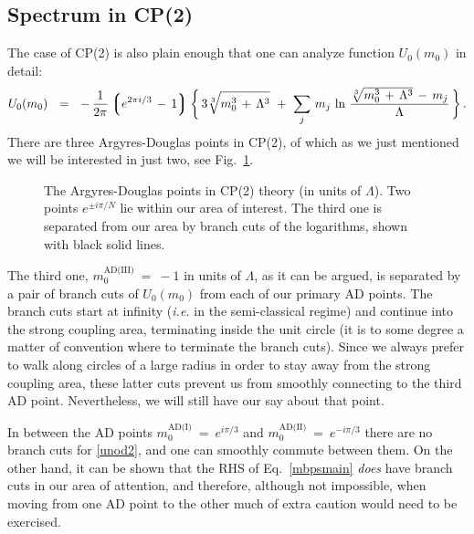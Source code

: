 \documentclass[epsfig,12pt]{article}
\def\beq{\begin{equation}}
\def\eeq{\end{equation}}
\def\beq{\begin{equation}}
\def\eeq{\end{equation}}
\newcommand{\lgr}{\left\lgroup}
\newcommand{\rgr}{\right\rgroup}
\begin{document}
\subsection{Spectrum in CP(2)}


	The case of CP(2) is also plain enough that one can analyze function $ U_0(m_0) $ in detail:
\beq
\label{unod2}
	U_0(m_0) ~~=~~ -\, \frac{1}{2\pi} \lgr e^{2\pi i / 3} \,-\, 1 \rgr 
	\bigg\{\, 3\sqrt[3]{ m_0^3 \,+\, \Lambda^3 } ~+~
		\sum_j\, m_j\, \ln \, \frac{ \sqrt[3] { m_0^3 \,+\, \Lambda^3 } \,-\, m_j } { \Lambda} \,\bigg\}\,.
\eeq
	There are three Argyres-Douglas points in CP(2), of which as we just mentioned we will be interested
	in just two, see Fig.~\ref{cp2}.
\begin{figure}
\begin{center}
\epsfxsize=6.4cm
\caption{\footnotesize
The Argyres-Douglas points in CP(2) theory (in units of $\Lambda$).
Two points $ e^{\pm i \pi / N} $ lie within our area of interest.
The third one is separated from our area by branch cuts of the logarithms, shown with black solid lines.
        }
\label{cp2}
\end{center}
\end{figure}
	The third one, $ m_0^\text{AD(III)} ~=~ -1 $ in units of $ \Lambda $, as it can be argued, 
	is separated by a pair of branch cuts of $ U_0 (m_0) $ from each of our primary AD points.
	The branch cuts start at infinity ({\it i.e.} in the semi-classical regime) and continue into the strong coupling area,
	terminating inside the unit circle (it is to some degree a matter of convention where to terminate the branch cuts).
	Since we always prefer to walk along circles of a large radius in order to stay away from the strong coupling area, 
	these latter cuts prevent us from smoothly connecting to the third AD point.
	Nevertheless, we will still have our say about that point.

	In between the AD points $ m_0^\text{AD(I)} ~=~ e^{ i \pi / 3 } $ and 
	$ m_0^\text{AD(II)} ~=~ e^{ - i \pi / 3 } $ there are no branch cuts for \eqref{unod2},
	and one can smoothly commute between them.
	On the other hand, it can be shown that the RHS of Eq.~\eqref{mbpsmain} {\it does} have branch cuts in our
	area of attention, and therefore, although not impossible, when moving from one AD point to the other
	much of extra caution would need to be exercised.
\end{document}
